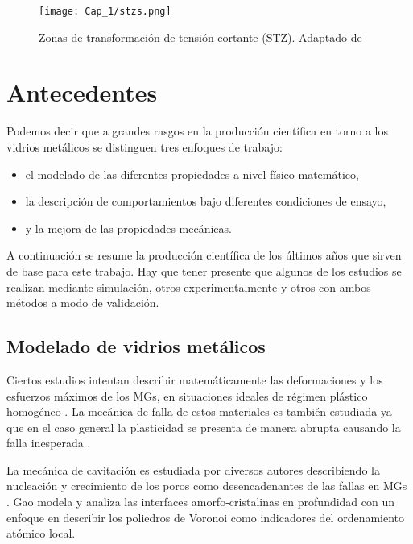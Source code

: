 \begin{figure}[H]
 \centering
 \texttt{[image: Cap\_1/stzs.png]}
 \caption[Zonas de transformación de tensión cortante]{Zonas de transformación de tensión cortante (STZ). Adaptado de \cite{albe13}}
 \label{C1:fg:stzs}
\end{figure}


\section{Antecedentes}
\label{S1_2}

Podemos decir que a grandes rasgos en la producción científica en torno a los vidrios metálicos se distinguen tres enfoques de trabajo:

\begin{itemize}
 \item el modelado de las diferentes propiedades a nivel físico-matemático,
 \item la descripción de comportamientos bajo diferentes condiciones de ensayo,
 \item y la mejora de las propiedades mecánicas.
\end{itemize}

A continuación se resume la producción científica de los últimos años que sirven de base para este trabajo. Hay que tener presente que algunos de los estudios se realizan mediante simulación, otros experimentalmente y otros con ambos métodos a modo de validación.

\subsection{Modelado de vidrios metálicos}
\label{S1_2_1}

Ciertos estudios intentan describir matemáticamente las deformaciones y los esfuerzos máximos de los MGs, en situaciones ideales de régimen plástico homogéneo \citep{Wisitsorasak12, cheng11}. La mecánica de falla de estos materiales es también estudiada ya que en el caso general la plasticidad se presenta de manera abrupta causando la falla inesperada \citep{Chen11, Egami11}.

La mecánica de cavitación es estudiada por diversos autores describiendo la nucleación y crecimiento de los poros como desencadenantes de las fallas en MGs \citep{Huang13, guan13}. Gao \citep{Gao14} modela y analiza las interfaces amorfo-cristalinas en profundidad con un enfoque en describir los poliedros de Voronoi como indicadores del ordenamiento atómico local.

